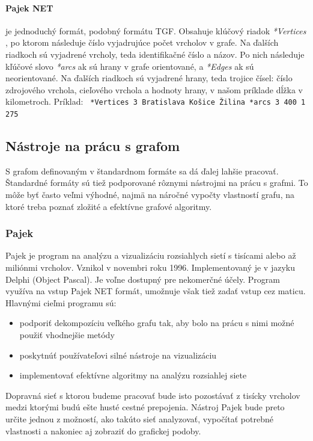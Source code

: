 \documentclass[12pt,twoside,slovak,a4paper]{article}
\begin{document}
	\paragraph{Pajek NET} je jednoduchý formát, podobný formátu TGF. Obsahuje klúčový riadok \emph{*Vertices} , po ktorom následuje číslo vyjadrujúce počet vrcholov v grafe. Na ďalších riadkoch sú vyjadrené vrcholy, teda identifikačné číslo a názov. Po nich následuje kľúčové slovo \emph{*arcs} ak sú hrany v grafe orientované, a \emph{*Edges}  ak sú neorientované. Na ďalších riadkoch sú vyjadrené hrany, teda trojice čísel: číslo zdrojového vrchola, cieľového vrchola a hodnoty hrany, v našom príklade dĺžka v kilometroch. 
\newline \newline
Príklad: \newline
\texttt{
*Vertices 3  Bratislava  Košice  Žilina \newline
*arcs  3 400  1 275 \newline
}

	\subsection{Nástroje na prácu s grafom} 
	S grafom definovaným v štandardnom formáte sa dá ďalej lahšie pracovať. Štandardné formáty sú tiež podporované rôznymi nástrojmi na prácu s grafmi. To môže byť často veľmi výhodné, najmä na náročné vypočty vlastností grafu, na ktoré treba poznať zložité a efektívne grafové algoritmy.
	
	\subsubsection{Pajek} 
	Pajek je program na analýzu a vizualizáciu rozsiahlych sietí s tisícami alebo až miliónmi vrcholov\cite{PAJEK}. Vznikol v novembri roku 1996. Implementovaný je v jazyku Delphi (Object Pascal). Je voľne dostupný pre nekomerčné účely. Program využíva na vstup Pajek NET formát, umožnuje však tiež zadať vstup cez maticu.
Hlavnými cieľmi programu sú: \cite{PAJEK}
\begin{itemize}
\item podporiť dekompozíciu veľkého grafu tak, aby bolo na prácu s nimi možné použiť vhodnejšie metódy
\item poskytnúť používateľovi silné nástroje na vizualizáciu
\item implementovať efektívne algoritmy na analýzu rozsiahlej siete
\end{itemize} 
	Dopravná sieť s ktorou budeme pracovať bude isto pozostávať z tisícky vrcholov medzi ktorými budú ešte husté cestné prepojenia. Nástroj Pajek bude preto určite jednou z možností, ako takúto sieť analyzovať, vypočítať potrebné vlastnosti a nakoniec aj zobraziť do grafickej podoby.
	
\end{document}
